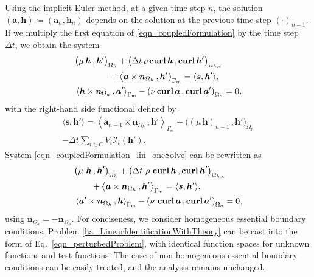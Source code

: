 \documentclass[journal]{IEEEtran}
\renewcommand{\vec}[1]{\boldsymbol{#1}} %
\newcommand{\paren}[1]{\left(#1\right)}
\newcommand{\parenangle}[1]{\left\langle#1\right\rangle}
\newcommand{\volInt}[3]{\paren{#1 \, , #2}_{#3}}
\newcommand{\volIntBig}[3]{\big(#1 \, , #2\big)_{#3}}
\newcommand{\surInt}[3]{\parenangle{#1 \, , #2}_{#3}}
\newcommand{\curl}{\text{\textbf{curl}}\, }
\newcommand{\Def}{\coloneqq}
\renewcommand{\a}{\vec a}
\newcommand{\h}{\vec h}
\newcommand{\Oa}{\Omega_a}
\newcommand{\Oh}{\Omega_h}
\newcommand{\Ohc}{\Omega_{h,\text{c}}}
\begin{document}
Using the implicit Euler method, at a given time step $n$, the solution $(\a,\h) \Def (\a_n, \h_n)$ depends on the solution at the previous time step $(\cdot)_{n-1}$. If we multiply the first equation of \eqref{eqn_coupledFormulation} by the time step $\Delta t$, we obtain the system
\begin{equation}\label{eqn_coupledFormulation_lin_oneSolve}
\begin{aligned}
& \volIntBig{\mu\, \h}{\h'}{\Oh} + \volInt{\Delta t\, \rho\, \curl \h}{\curl \h'}{\Ohc}\\
& \qquad\qquad + \surInt{\a \times\vec n_{\Oh}}{\h'}{\Gamma_\text{m}} = \langle \vec s, \h' \rangle,\\
&\surInt{\h\times\vec n_{\Oa}}{\a'}{\Gamma_\text{m}} - \volInt{\nu\, \curl \a}{\curl \a'}{\Oa}= 0,
\end{aligned}
\end{equation}
with the right-hand side functional defined by
\begin{multline}
\langle \vec s, \h' \rangle = \surInt{\a_{n-1} \times\vec n_{\Oh}}{\h'}{\Gamma_\text{m}} + \volIntBig{(\mu\, \h)_{n-1}}{\h'}{\Oh}\\
 - \Delta t \sum_{i\in C} V_i \mathcal{I}_i(\h').
\end{multline}
System \eqref{eqn_coupledFormulation_lin_oneSolve} can be rewritten as
\begin{equation}\label{ha_LinearIdentificationWithTheory}
\begin{aligned}
& \volIntBig{\mu\ \h}{\h'}{\Oh} + \volInt{\Delta t\ \rho\ \curl \h}{\curl \h'}{\Ohc}\\
& \qquad  + \surInt{\a \times\vec n_{\Oh}}{\h'}{\Gamma_\text{m}} = \langle \vec s, \h' \rangle,\\
& \surInt{\a'\times\vec n_{\Oh}}{\h}{\Gamma_\text{m}} - \volInt{\nu\ \curl \a}{\curl \a'}{\Oa} = 0,
\end{aligned}
\end{equation}
using $\vec n_{\Oa} = - \vec n_{\Oh}$. For conciseness, we consider homogeneous essential boundary conditions. Problem \eqref{ha_LinearIdentificationWithTheory} can be cast into the form of Eq.~\eqref{eqn_perturbedProblem}, with identical function spaces for unknown functions and test functions. The case of non-homogeneous essential boundary conditions can be easily treated, and the analysis remains unchanged.
\end{document}
